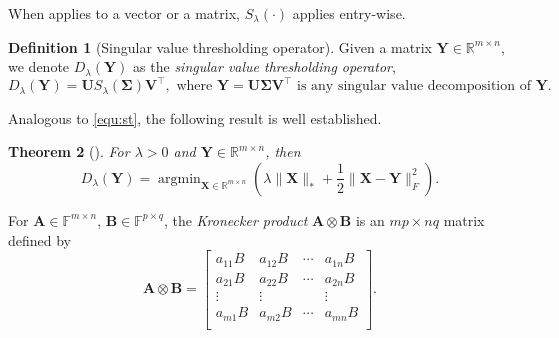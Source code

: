\documentclass[10pt]{article}  	%
\newtheorem{theorem}{Theorem}[section]
\theoremstyle{definition}
\newtheorem{definition}[theorem]{Definition}
\theoremstyle{definition}
\DeclareMathOperator*{\argmin}{argmin}
\newcommand{\R}{{\mathbb{R}}}
\newcommand{\F}{{\mathbb{F}}}
\newcommand{\mA}{\mathbf{A}}
\newcommand{\mB}{\mathbf{B}}
\newcommand{\mM}{\mathbf{M}}
\newcommand{\mU}{\mathbf{U}}
\newcommand{\mV}{\mathbf{V}}
\newcommand{\mX}{\mathbf{X}}
\newcommand{\mY}{\mathbf{Y}}
\theoremstyle{remark}
\begin{document}
When applies to a vector or a matrix, $S_\lambda(\cdot)$ applies entry-wise.

\begin{definition}[Singular value thresholding operator] \label{def:3.4}
\normalfont
Given a matrix $\mY \in \mathbb{R}^{m\times n}$, we denote $D_\lambda(\mY)$ as the \emph{singular value thresholding operator}, 
$$
D_\lambda(\mY)= \mU S_{\lambda}(\mathbf{\mathbf{\Sigma}})\mV^\top,\text{ where }\mY = \mU\mathbf{\mathbf{\Sigma}} \mV^\top \text{ is any singular value decomposition of }\mY.
$$
\end{definition}

Analogous to \eqref{equ:st}, the following result is well established.
\begin{theorem}[\cite{CCS10}] \label{thm:svs} For $\lambda > 0$ and $\mY \in \mathbb{R}^{m\times n}$, then
$$
D_{\lambda}(\mY) = \argmin_{\mX\in\R^{m\times n}}\left(\lambda\| \mX \|_* + \frac{1}{2}\| \mX - \mY \|^2_F\right).
$$

\end{theorem}


For $\mA \in \F^{m \times n}$, $\mB \in \mathbb{F}^{p \times q}$, the \emph{Kronecker product} $\mA \otimes \mB$ is an $mp \times nq$  matrix defined by
    \[
    \mA \otimes \mB = 
    \begin{bmatrix}
        a_{11}  B & a_{12}  B & \cdots & a_{1n} B \\
        a_{21}  B & a_{22} B & \cdots & a_{2n} B \\
        \vdots & \vdots &  & \vdots \\
        a_{m1}  B & a_{m2}  B & \cdots & a_{mn}  B \\
    \end{bmatrix}.
    \]
\end{document}
